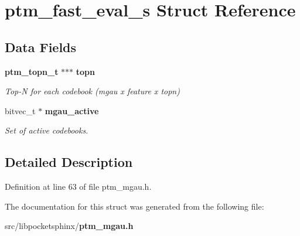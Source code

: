 \section{ptm\-\_\-fast\-\_\-eval\-\_\-s Struct Reference}
\label{structptm__fast__eval__s}
\subsection*{Data Fields}
\begin{DoxyCompactItemize}
\item 
{\bf ptm\-\_\-topn\-\_\-t} $\ast$$\ast$$\ast$ {\bf topn}\label{structptm__fast__eval__s_a95e382028ed8a0af8b56bfcb797af96b}

\begin{DoxyCompactList}\small\item\em Top-\/\-N for each codebook (mgau x feature x topn) \end{DoxyCompactList}\item 
bitvec\-\_\-t $\ast$ {\bf mgau\-\_\-active}\label{structptm__fast__eval__s_ac5d3b21239d567b395015d7c4fea157c}

\begin{DoxyCompactList}\small\item\em Set of active codebooks. \end{DoxyCompactList}\end{DoxyCompactItemize}


\subsection{Detailed Description}


Definition at line 63 of file ptm\-\_\-mgau.\-h.



The documentation for this struct was generated from the following file\-:\begin{DoxyCompactItemize}
\item 
src/libpocketsphinx/{\bf ptm\-\_\-mgau.\-h}\end{DoxyCompactItemize}
